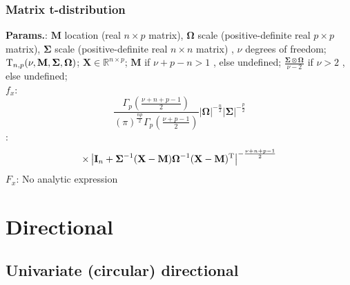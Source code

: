     
        
\subsubsection{Matrix t-distribution}





    {\color{darkblue} \textbf{Params.}:} {$\mathbf{M}$ location (real $n\times p$ matrix),  $\boldsymbol\Omega$ scale (positive-definite real $p\times p$ matrix),  $\boldsymbol\Sigma$ scale (positive-definite real $n\times n$ matrix) ,  $\nu$ degrees of freedom}; {${\rm T}_{n,p}(\nu,\mathbf{M},\boldsymbol\Sigma, \boldsymbol\Omega)$}; {$\mathbf{X} \in\mathbb{R}^{n\times p}$}; {$\mathbf{M}$ if $\nu + p - n > 1$ , else undefined}; {$\frac{\boldsymbol\Sigma \otimes \boldsymbol\Omega}{\nu-2}$ if $\nu > 2$ , else undefined};\hspace{0.5cm}\\{\color{darkblue} \textbf{$f_x$}:} {$$\frac{\Gamma_p\left(\frac{\nu+n+p-1}{2}\right)}{(\pi)^\frac{np}{2} \Gamma_p\left(\frac{\nu+p-1}{2}\right)} |\boldsymbol\Omega|^{-\frac{n}{2}} |\boldsymbol\Sigma|^{-\frac{p}{2}}$$ : $$\times \left|\mathbf{I}_n + \boldsymbol\Sigma^{-1}(\mathbf{X} - \mathbf{M})\boldsymbol\Omega^{-1}(\mathbf{X}-\mathbf{M})^{\rm T}\right|^{-\frac{\nu+n+p-1}{2}}$$}{\color{darkblue} \textbf{$F_x$}:} {No analytic expression}



    

        

        
    


    \section{Directional}
        
            \subsection{Univariate (circular) directional}

